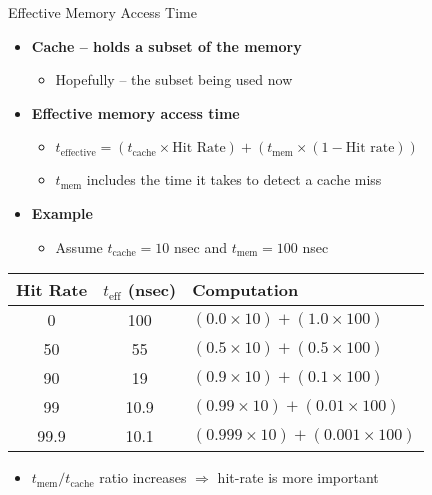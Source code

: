 \documentclass[aspectratio=169,12pt]{beamer}
\begin{document}
\begin{frame}{Effective Memory Access Time}
\begin{itemize}
  \item \textbf{Cache -- holds a subset of the memory}
  \begin{itemize}
    \item Hopefully -- the subset being used now
  \end{itemize}
  
  \item \textbf{Effective memory access time}
  \begin{itemize}
    \item $t_{\text{effective}} = (t_{\text{cache}} \times \text{Hit Rate}) + (t_{\text{mem}} \times (1 - \text{Hit rate}))$
    \item $t_{\text{mem}}$ includes the time it takes to detect a cache miss
  \end{itemize}
  
  \item \textbf{Example}
  \begin{itemize}
    \item Assume $t_{\text{cache}} = 10$ nsec and $t_{\text{mem}} = 100$ nsec
  \end{itemize}
\end{itemize}

\begin{center}
\begin{tabular}{c|c|l}
\textbf{Hit Rate} & \textbf{$t_{\text{eff}}$ (nsec)} & \textbf{Computation} \\
\hline
0 & 100 & $(0.0 \times 10) + (1.0 \times 100)$ \\
50 & 55 & $(0.5 \times 10) + (0.5 \times 100)$ \\
90 & 19 & $(0.9 \times 10) + (0.1 \times 100)$ \\
99 & 10.9 & $(0.99 \times 10) + (0.01 \times 100)$ \\
99.9 & 10.1 & $(0.999 \times 10) + (0.001 \times 100)$ \\
\end{tabular}
\end{center}

\begin{itemize}
  \item $t_{\text{mem}}/t_{\text{cache}}$ ratio increases $\Rightarrow$ hit-rate is more important
\end{itemize}
\end{frame}
\end{document}
